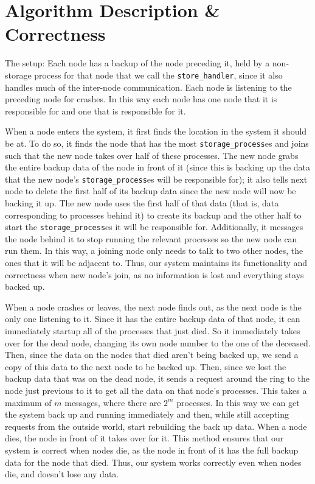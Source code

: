 \documentclass[12pt,letterpaper]{article}
\renewcommand{\tt}[1]{\texttt{#1}}
\newcommand{\sh}{\tt{store\_handler}}
\renewcommand{\sp}{\tt{storage\_process}}
\begin{document}
\section*{Algorithm Description \& Correctness}
The setup:
Each node has a backup of the node preceding it, held by a non-storage process for that node that we call the \sh, since it also handles much of the inter-node communication. Each node is listening to the preceding node for crashes. In this way each node has one node that it is responsible for and one that is responsible for it.

When a node enters the system, it first finds the location in the system it should be at. To do so, it finds the node that has the most \sp es and joins such that the new node takes over half of these processes. The new node grabs the entire backup data of the node in front of it (since this is backing up the data that the new node's \sp es will be responsible for); it also tells next node to delete the first half of its backup data since the new node will now be backing it up. The new node uses the first half of that data (that is, data corresponding to processes behind it) to create its backup and the other half to start the \sp es it will be responsible for. Additionally, it messages the node behind it to stop running the relevant processes so the new node can run them. In this way, a joining node only needs to talk to two other nodes, the ones that it will be adjacent to. Thus, our system maintains its functionality and correctness when new node's join, as no information is lost and everything stays backed up.

When a node crashes or leaves, the next node finds out, as the next node is the only one listening to it. Since it has the entire backup data of that node, it can immediately startup all of the processes that just died. So it immediately takes over for the dead node, changing its own node number to the one of the deceased. Then, since the data on the nodes that died aren't being backed up, we send a copy of this data to the next node to be backed up. Then, since we lost the backup data that was on the dead node, it sends a request around the ring to the node just previous to it to get all the data on that node's processes. This takes a maximum of $m$ messages, where there are $2^m$ processes. In this way we can get the system back up and running immediately and then, while still accepting requests from the outside world, start rebuilding the back up data. When a node dies, the node in front of it takes over for it. This method ensures that our system is correct when nodes die, as the node in front of it has the full backup data for the node that died. Thus, our system works correctly even when nodes die, and doesn't lose any data.
\end{document}
